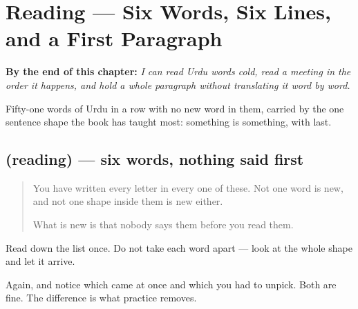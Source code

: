 
\chapter{Reading — Six Words, Six Lines, and a First Paragraph}
\label{ch:ur-pehla-sabaq}

\begin{chapteropening}
\textbf{By the end of this chapter:} \emph{I can read Urdu words cold, read a meeting in the order it happens, and hold a whole paragraph without translating it word by word.}

Fifty-one words of Urdu in a row with no new word in them, carried by the one sentence shape the book has taught most: something is something, with  last.
\end{chapteropening}

\section[(reading)]{(reading) — six words, nothing said first}

\label{lesson:UR-C33-words}



\begin{quote}
You have written every letter in every one of these. Not one word is new, and not one shape inside them is new either.

What is new is that nobody says them before you read them.
\end{quote}

\begin{tcolorbox}[breakable,skin=enhanced,colback=orange!6,colframe=orange!45!black,boxrule=0.5pt,arc=1mm,left=6pt,right=6pt,top=4pt,bottom=4pt,fonttitle=\bfseries,title={Read this}]
\begin{quote}
     
\end{quote}

Read down the list once. Do not take each word apart — look at the whole shape and let it arrive.

Again, and notice which came at once and which you had to unpick. Both are fine. The difference is what practice removes.
\end{tcolorbox}

